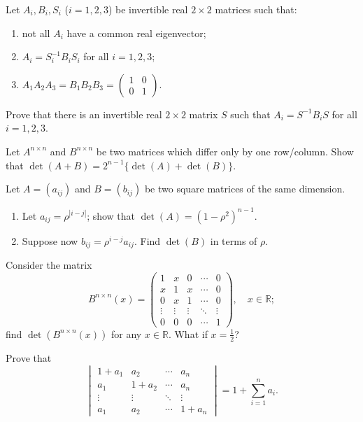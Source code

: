 \documentclass[12pt]{article}
\begin{document}
\begin{problems}
\item Let $A_i,B_i,S_i$ ($i=1,2,3$) be invertible real $2\times 2$ matrices such that:
\begin{enumerate}[label=(\arabic*)]
\item not all $A_i$ have a common real eigenvector;
\item $A_i = S_i^{-1}B_iS_i$ for all $i=1,2,3$;
\item $A_1A_2A_3 = B_1B_2B_3 = \begin{pmatrix}1 & 0\\ 0 & 1\end{pmatrix}$.
\end{enumerate}
Prove that there is an invertible real $2\times 2$ matrix $S$ such that $A_i=S^{-1}B_iS$ for all $i=1,2,3$.

\item Let $A^{n\times n}$ and $B^{n\times n}$ be two matrices which differ only by one row/column. Show that $\det(A+B) = 2^{n-1}\{\det(A)+\det(B)\}$.

\item Let $A=(a_{ij})$ and $B=(b_{ij})$ be two square matrices of the same dimension.
\begin{enumerate}[label=(\alph*)]
\item Let $a_{ij}=\rho^{|i-j|}$; show that $\det(A) = (1-\rho^2)^{n-1}$.
\item Suppose now $b_{ij}=\rho^{i-j}a_{ij}$. Find $\det(B)$ in terms of $\rho$.
\end{enumerate}

\item Consider the matrix
\[
B^{n\times n}(x) = \begin{pmatrix}
1 & x & 0 & \cdots & 0\\
x & 1 & x & \cdots & 0\\
0 & x & 1 & \cdots & 0\\
\vdots & \vdots & \vdots & \ddots & \vdots\\
0 & 0 & 0 & \cdots & 1
\end{pmatrix}, \quad x\in\mathbb{R};
\]
find $\det(B^{n\times n}(x))$ for any $x\in\mathbb{R}$. What if $x=\tfrac12$?

\item Prove that
\[
\begin{vmatrix}
1+a_1 & a_2 & \cdots & a_n\\
a_1 & 1+a_2 & \cdots & a_n\\
\vdots & \vdots & \ddots & \vdots\\
a_1 & a_2 & \cdots & 1+a_n
\end{vmatrix} = 1+\sum_{i=1}^n a_i.
\]


\end{problems}
\end{document}
